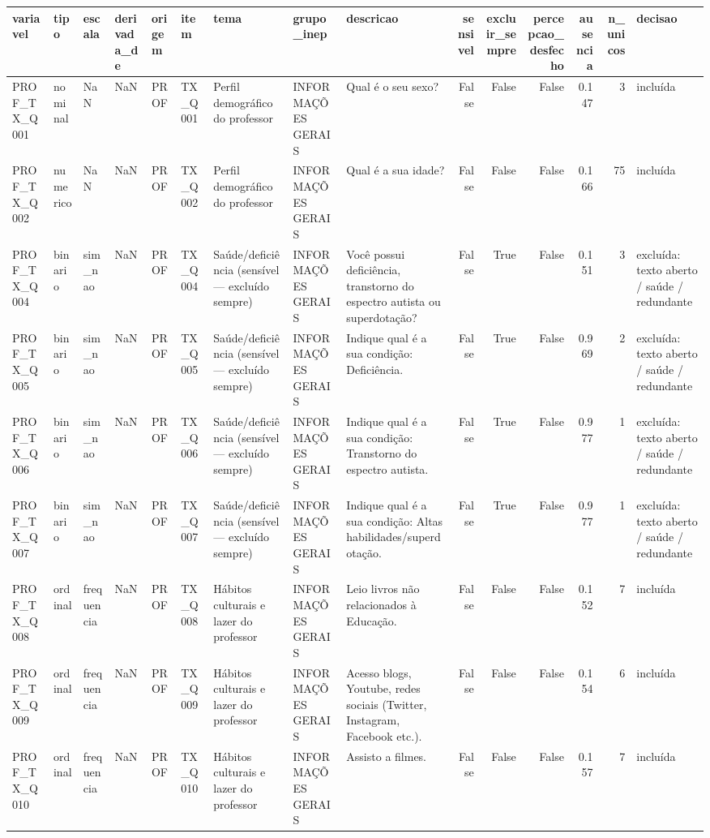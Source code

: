 \begin{tabular}{lllllllllrrrrrl}
\toprule
variavel & tipo & escala & derivada\_de & origem & item & tema & grupo\_inep & descricao & sensivel & excluir\_sempre & percepcao\_desfecho & ausencia & n\_unicos & decisao \\
\midrule
PROF\_TX\_Q001 & nominal & NaN & NaN & PROF & TX\_Q001 & Perfil demográfico do professor & INFORMAÇÕES GERAIS & Qual é o seu sexo? & False & False & False & 0.147 & 3 & incluída \\
PROF\_TX\_Q002 & numerico & NaN & NaN & PROF & TX\_Q002 & Perfil demográfico do professor & INFORMAÇÕES GERAIS & Qual é a sua idade? & False & False & False & 0.166 & 75 & incluída \\
PROF\_TX\_Q004 & binario & sim\_nao & NaN & PROF & TX\_Q004 & Saúde/deficiência (sensível — excluído sempre) & INFORMAÇÕES GERAIS & Você possui deficiência, transtorno do espectro autista ou superdotação? & False & True & False & 0.151 & 3 & excluída: texto aberto / saúde / redundante \\
PROF\_TX\_Q005 & binario & sim\_nao & NaN & PROF & TX\_Q005 & Saúde/deficiência (sensível — excluído sempre) & INFORMAÇÕES GERAIS & Indique qual é a sua condição:  Deficiência. & False & True & False & 0.969 & 2 & excluída: texto aberto / saúde / redundante \\
PROF\_TX\_Q006 & binario & sim\_nao & NaN & PROF & TX\_Q006 & Saúde/deficiência (sensível — excluído sempre) & INFORMAÇÕES GERAIS & Indique qual é a sua condição: Transtorno do espectro autista. & False & True & False & 0.977 & 1 & excluída: texto aberto / saúde / redundante \\
PROF\_TX\_Q007 & binario & sim\_nao & NaN & PROF & TX\_Q007 & Saúde/deficiência (sensível — excluído sempre) & INFORMAÇÕES GERAIS & Indique qual é a sua condição: Altas habilidades/superdotação. & False & True & False & 0.977 & 1 & excluída: texto aberto / saúde / redundante \\
PROF\_TX\_Q008 & ordinal & frequencia & NaN & PROF & TX\_Q008 & Hábitos culturais e lazer do professor & INFORMAÇÕES GERAIS & Leio livros não relacionados à Educação. & False & False & False & 0.152 & 7 & incluída \\
PROF\_TX\_Q009 & ordinal & frequencia & NaN & PROF & TX\_Q009 & Hábitos culturais e lazer do professor & INFORMAÇÕES GERAIS & Acesso blogs, Youtube, redes sociais (Twitter, Instagram, Facebook etc.). & False & False & False & 0.154 & 6 & incluída \\
PROF\_TX\_Q010 & ordinal & frequencia & NaN & PROF & TX\_Q010 & Hábitos culturais e lazer do professor & INFORMAÇÕES GERAIS & Assisto a filmes. & False & False & False & 0.157 & 7 & incluída \\

\end{tabular}
